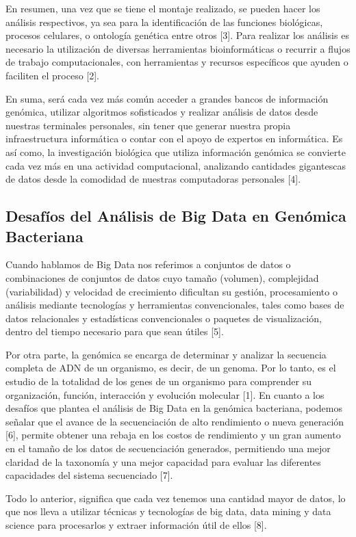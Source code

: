 \documentclass[12pt]{article}
\begin{document}
En resumen, una vez que se tiene el montaje realizado, se pueden hacer los análisis 
respectivos, ya sea para la identificación de las funciones biológicas, procesos 
celulares, o ontología genética entre otros [3]. Para realizar los análisis es necesario 
la utilización de diversas herramientas bioinformáticas o recurrir a flujos de trabajo 
computacionales, con herramientas y recursos específicos que ayuden o 
faciliten el proceso [2].

En suma, será cada vez más común acceder a grandes bancos de información genómica, 
utilizar algoritmos sofisticados y realizar análisis de datos desde nuestras 
terminales personales, sin tener que generar nuestra propia infraestructura informática o 
contar con el apoyo de expertos en informática. Es así como, la investigación biológica que 
utiliza información genómica se convierte cada vez más en una actividad computacional, 
analizando cantidades gigantescas de datos desde la comodidad de nuestras computadoras 
personales [4].

\subsection*{Desafíos del Análisis de Big Data en Genómica Bacteriana}

Cuando hablamos de Big Data nos referimos a conjuntos de datos o combinaciones de 
conjuntos de datos cuyo tamaño (volumen), complejidad (variabilidad) y velocidad de 
crecimiento dificultan su gestión, procesamiento o análisis mediante tecnologías y 
herramientas convencionales, tales como bases de datos relacionales y estadísticas 
convencionales o paquetes de visualización, dentro del tiempo necesario para que 
sean útiles [5].

Por otra parte, la genómica se encarga de determinar y analizar la secuencia 
completa de ADN de un organismo, es decir, de un genoma. Por lo tanto, es el 
estudio de la totalidad de los genes de un organismo para comprender su organización, 
función, interacción y evolución molecular [1]. En cuanto a los desafíos que plantea 
el análisis de Big Data en la genómica bacteriana, podemos señalar que el avance de la 
secuenciación de alto rendimiento o nueva generación [6], permite obtener una rebaja en 
los costos de rendimiento y un gran aumento en el tamaño de los datos de secuenciación 
generados, permitiendo una mejor claridad de la taxonomía y una mejor capacidad para 
evaluar las diferentes capacidades del sistema secuenciado [7].

Todo lo anterior, significa que cada vez tenemos una cantidad mayor de datos, 
lo que nos lleva a utilizar técnicas y tecnologías de big data, data mining y 
data science para procesarlos y extraer información útil de ellos [8].
\end{document}
